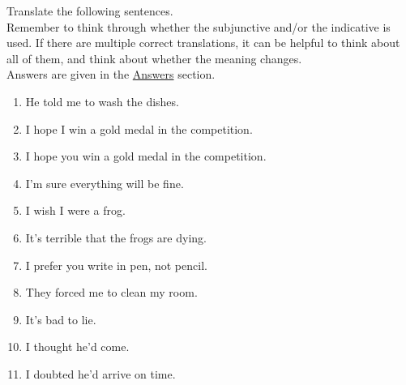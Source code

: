 Translate the following sentences.\\

Remember to think through whether the subjunctive and/or the indicative is used. If there are multiple correct translations, it can be helpful to think about all of them, and think about whether the meaning changes. \\

Answers are given in the \hyperref[sec:ans]{Answers} section.

\begin{enumerate}
	\item He told me to wash the dishes.
	\item I hope I win a gold medal in the competition.
	\item I hope you win a gold medal in the competition.
	\item I'm sure everything will be fine.
	\item I wish I were a frog.
	\item It's terrible that the frogs are dying. 
	\item I prefer you write in pen, not pencil.
	\item They forced me to clean my room.
	\item It's bad to lie.
	\item I thought he'd come.
	\item I doubted he'd arrive on time. 
\end{enumerate}
